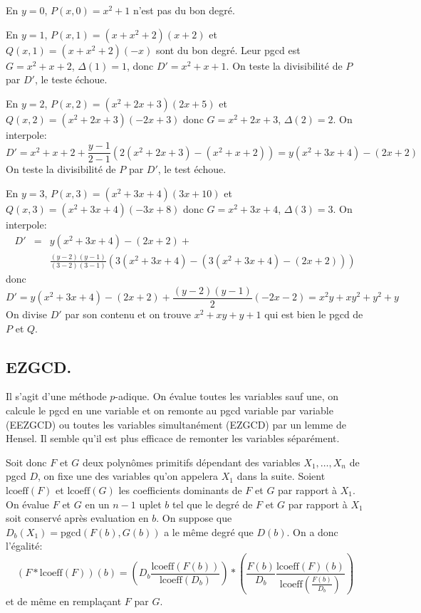 \documentclass[a4paper,11pt]{book}
\begin{document}
\begin{giacjshere}
En $y = 0$, $P ( x, 0 ) = x^2 + 1$ n'est pas du bon degré.

En $y = 1$, $P ( x, 1 ) = ( x + x^2 + 2 ) ( x + 2 )$ et $Q ( x, 1 ) = ( x +
x^2 + 2 ) ( - x )$ sont du bon degré. Leur pgcd est $G = x^2 + x + 2$, $\Delta
( 1 ) = 1$, donc $D' = x^2 + x + 1$. On teste la divisibilité de $P$ par $D'$,
le teste échoue.

En $y = 2$, $P ( x, 2 ) = ( x^2 + 2 x + 3 ) ( 2 x + 5 )$ et $Q ( x, 2 ) = (
x^2 + 2 x + 3 ) ( - 2 x + 3 )$ donc $G = x^2 + 2 x + 3$, $\Delta ( 2 ) = 2$.
On interpole:
\[ D' = x^2 + x + 2 + \frac{y - 1}{2 - 1} ( 2 ( x^2 + 2 x + 3 ) - ( x^2 + x +
   2 )) = y ( x^2 + 3 x + 4 ) - ( 2 x + 2 ) \]
On teste la divisibilité de $P$ par $D'$, le test échoue.

En $y = 3$, $P ( x, 3 ) = ( x^2 + 3 x + 4 ) ( 3 x + 10 )$ et $Q ( x, 3 ) = (
x^2 + 3 x + 4 ) ( - 3 x + 8 )$ donc $G = x^2 + 3 x + 4$, $\Delta ( 3 ) = 3$.
On interpole:
\begin{eqnarray*}
  D' &= &y ( x^2 + 3 x + 4 ) - ( 2 x + 2 ) + \\
  & & \frac{( y - 2 ) ( y - 1 )}{( 3 - 2
  ) ( 3 - 1 )} \left( 3 ( x^2 + 3 x + 4 ) - ( 3 ( x^2 + 3 x + 4 ) - ( 2 x + 2
  )) \right)
\end{eqnarray*}
donc
\[ D' = y ( x^2 + 3 x + 4 ) - ( 2 x + 2 ) + \frac{( y - 2 ) ( y - 1 )}{2} ( -
   2 x - 2 ) = x^2 y + x y^2 + y^2 + y \]
On divise $D'$ par son contenu et on trouve $x^2 + x y + y + 1$ qui est bien
le pgcd de $P$ et $Q$.

\subsection{EZGCD.}

Il s'agit d'une méthode $p$-adique. On évalue toutes les variables sauf une,
on calcule le pgcd en une variable et on remonte au pgcd variable par variable
(EEZGCD) ou toutes les variables simultanément (EZGCD) par un lemme de Hensel.
Il semble qu'il est plus efficace de remonter les variables séparément.

Soit donc $F$ et $G$ deux polynômes primitifs dépendant des variables $X_1,
\ldots, X_n$ de pgcd $D$, on fixe une des variables qu'on appelera $X_1$ dans
la suite. Soient $\mbox{lcoeff} ( F )$ et $\mbox{lcoeff} ( G )$ les
coefficients dominants de $F$ et $G$ par rapport à $X_1$. On évalue $F$ et $G$
en un $n - 1$ uplet $b$ tel que le degré de $F$ et $G$ par rapport à $X_1$
soit conservé après evaluation en $b$. On suppose que $D_b ( X_1 ) =
\mbox{pgcd} ( F ( b ), G ( b ))$ a le même degré que $D ( b )$. On a donc
l'égalité:
\[ ( F \ast \mbox{lcoeff} ( F )) ( b ) = \left( D_b  \frac{\mbox{lcoeff} ( F (
   b ))}{\mbox{lcoeff} ( D_b )} \right) \ast \left( \frac{F ( b )}{D_b} 
   \frac{\mbox{lcoeff} ( F ) ( b )}{\mbox{lcoeff} ( \frac{F ( b )}{D_b} )}
   \right) \]
et de même en remplaçant $F$ par $G$.


\end{giacjshere}
\end{document}
